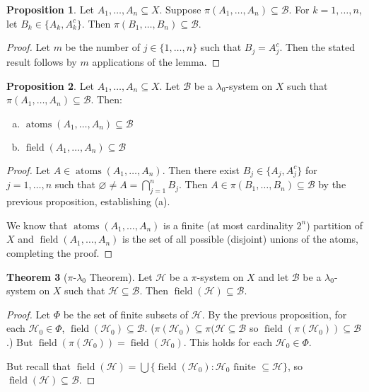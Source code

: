 \documentclass{article}
\DeclareMathOperator{\atoms}{atoms}
\DeclareMathOperator{\field}{field}
\theoremstyle{definition}
\newtheorem{theorem}{Theorem}
\newtheorem{proposition}[theorem]{Proposition}
\begin{document}
\begin{proposition}
    Let $A_1, \ldots, A_n \subseteq X$. Suppose $\pi(A_1, \ldots, A_n) \subseteq \mathscr{B}$. For $k = 1, \ldots, n$, let $B_k\in \{A_k, A_k^c\}$. Then $\pi(B_1, \ldots, B_n) \subseteq \mathscr{B}$.
\end{proposition}
\begin{proof}
    Let $m$ be the number of $j \in \{1, \ldots, n\}$ such that $B_j = A_j^c$. Then the stated result follows by $m$ applications of the lemma.
\end{proof}

\begin{proposition}
    Let $A_1, \ldots, A_n \subseteq X$. Let $\mathscr{B}$ be a $\lambda_0$-system on $X$ such that $\pi(A_1, \ldots, A_n) \subseteq \mathscr{B}$. Then:
    \begin{enumerate}[(a)]
        \item $\atoms(A_1, \ldots, A_n) \subseteq \mathscr{B}$
        \item $\field(A_1, \ldots, A_n) \subseteq \mathscr{B}$
    \end{enumerate}
\end{proposition}
\begin{proof}
    Let $A \in \atoms(A_1, \ldots, A_n)$. Then there exist $B_j \in \{A_j, A_j^c\}$ for $j = 1, \ldots, n$ such that $\varnothing \neq A = \bigcap_{j=1}^n B_j$. Then $A \in \pi(B_1, \ldots, B_n) \subseteq \mathscr{B}$ by the previous proposition, establishing (a).
    
    We know that $\atoms(A_1, \ldots, A_n)$ is a finite (at most cardinality $2^n$) partition of $X$ and $\field(A_1, \ldots, A_n)$ is the set of all possible (disjoint) unions of the atoms, completing the proof.
\end{proof}

\begin{theorem}[$\pi$-$\lambda_0$ Theorem]
    Let $\mathscr{H}$ be a $\pi$-system on $X$ and let $\mathscr{B}$ be a $\lambda_0$-system on $X$ such that $\mathscr{H} \subseteq \mathscr{B}$. Then $\field(\mathscr{H}) \subseteq \mathscr{B}$.
\end{theorem}
\begin{proof}
    Let $\Phi$ be the set of finite subsets of $\mathscr{H}$. By the previous proposition, for each $\mathscr{H}_0 \in \Phi$, $\field(\mathscr{H}_0) \subseteq \mathscr{B}$.
    ($\pi(\mathscr{H}_0) \subseteq \pi(\mathscr{H} \subseteq \mathscr{B}$ so $\field(\pi(\mathscr{H}_0)) \subseteq \mathscr{B}$.)
    But $\field(\pi(\mathscr{H}_0)) = \field(\mathscr{H}_0)$. This holds for each $\mathscr{H}_0 \in \Phi$.
    
    But recall that $\field(\mathscr{H}) = \bigcup \{\field(\mathscr{H}_0) : \mathscr{H}_0\text{ finite } \subseteq \mathscr{H \}}$, so $\field(\mathscr{H}) \subseteq \mathscr{B}$.
\end{proof}
\end{document}
